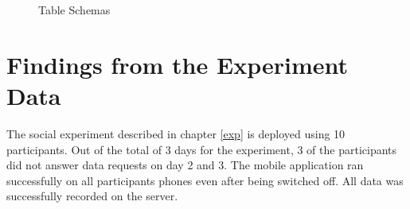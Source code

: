 \begin{figure}[htp]
\hspace{1em}
\newline
\centering
{}
\caption{Table Schemas}
\label{fig:st3}
\end{figure}

\section{Findings from the Experiment Data}

The social experiment described in chapter \ref{exp} is deployed using 10 participants. Out of the total of 3 days for the experiment, 3 of the participants did not answer data requests on day 2 and 3. The mobile application ran successfully on all participants phones even after being switched off. All data was successfully recorded on the server.

